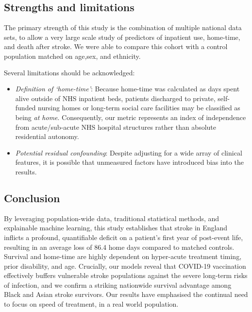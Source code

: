 \subsection{Strengths and limitations}

The primary strength of this study is the combination of multiple national data sets, to allow a very large scale study of predictors of inpatient use, home-time, and death after stroke. We were able to compare this cohort with a control population matched on age,sex, and ethnicity.

Several limitations should be acknowledged:

\begin{itemize}
    \item \textit{Definition of `home-time'}:  Because home-time was calculated as days spent alive outside of NHS inpatient beds, patients discharged to private, self-funded nursing homes or long-term social care facilities may be classified as being \textit{at home}. Consequently, our metric represents an index of independence from acute/sub-acute NHS hospital structures rather than absolute residential autonomy.
    \item \textit{Potential residual confounding}: Despite adjusting for a wide array of clinical features, it is possible that unmeasured factors have introduced bias into the results.
\end{itemize}

\subsection{Conclusion}

By leveraging population-wide data, traditional statistical methods, and  explainable machine learning, this study establishes that stroke in England inflicts a profound, quantifiable deficit on a patient's first year of post-event life, resulting in an average loss of 86.4 home days compared to matched controls. Survival and home-time are highly dependent on hyper-acute treatment timing, prior disability, and age. Crucially, our models reveal that COVID-19 vaccination effectively buffers vulnerable stroke populations against the severe long-term risks of infection, and we confirm a striking nationwide survival advantage among Black and Asian stroke survivors. Our results have emphasised the continual need to focus on speed of treatment, in a real world population. 